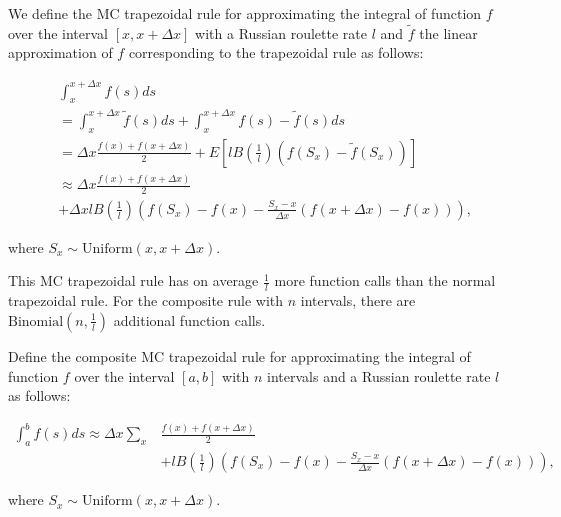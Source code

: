 \documentclass[a4paper,12pt]{article}
\begin{document}
\begin{definition}
    We define the MC trapezoidal rule for approximating the integral
    of function $f$ over the interval $[x, x+\Delta x]$ with a Russian roulette rate
    $l$ and $\tilde{f}$ the linear approximation of $f$ corresponding
    to the trapezoidal rule as follows:

    \begin{align}
         & \int_{x}^{x+\Delta x} f(s) ds                                       \\
         & = \int_{x}^{x+\Delta x}  \tilde{f}(s) ds +
        \int_{x}^{x+\Delta x}  f(s) - \tilde{f}(s) ds                          \\
         & = \Delta x \frac{f(x) + f(x+\Delta x)}{2}
        + E \left[l B\left( \frac{1}{l}\right)(f(S_x) - \tilde{f}(S_x))\right] \\
         & \approx \Delta x \frac{f(x) + f(x+\Delta x)}{2}                     \\
         & + \Delta x l B\left( \frac{1}{l}\right)
        \left(f(S_x) - f(x) - \frac{S_x - x}{\Delta x}
        \left(f(x+\Delta x) - f(x)\right) \right),
    \end{align}

    where $S_x \sim \text{Uniform}(x,x+\Delta x)$.
\end{definition}


This MC trapezoidal rule has on average $\frac{1}{l}$ more function calls than
the normal trapezoidal rule. For the composite rule with $n$ intervals,
there are $\text{Binomial}(n,\frac{1}{l})$ additional function calls.


\begin{definition} \label{MCtrap}
    Define the composite MC trapezoidal rule for approximating the integral
    of function $f$ over the interval $[a, b]$ with $n$ intervals
    and a Russian roulette rate $l$ as follows:

    \begin{align}
        \int_{a}^{b} f(s) ds \approx \Delta x \sum_{x} & \frac{f(x) + f(x+\Delta x)}{2} \\
                                                       & + l B\left(\frac{1}{l}\right)
        \left(f(S_x) - f(x) - \frac{S_x - x}{\Delta x}(f(x+\Delta x) - f(x))\right),
    \end{align}

    where $S_x \sim \text{Uniform}(x,x+\Delta x)$.

\end{definition}
\end{document}
